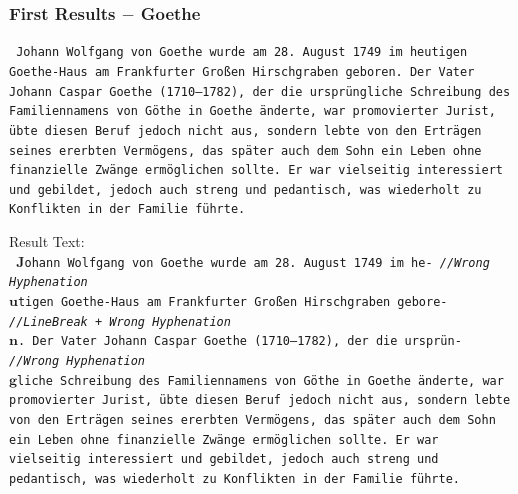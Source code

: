\documentclass{beamer}
\begin{document}
\begin{frame}
\frametitle{First Results $-$ Goethe}
\texttt{\tiny
Johann Wolfgang von Goethe wurde am 28. August 1749 im heutigen \\
Goethe-Haus am Frankfurter Großen Hirschgraben geboren. Der Vater \\
Johann Caspar Goethe (1710–1782), der die ursprüngliche Schreibung des \\
Familiennamens von Göthe in Goethe änderte, war promovierter Jurist, \\
übte diesen Beruf jedoch nicht aus, sondern lebte von den Erträgen \\
seines ererbten Vermögens, das später auch dem Sohn ein Leben ohne \\
finanzielle Zwänge ermöglichen sollte. Er war vielseitig interessiert \\
und gebildet, jedoch auch streng und pedantisch, was wiederholt zu \\
Konflikten in der Familie führte. \\
}

Result Text: \\

\texttt{\tiny
$\boldsymbol{J}$ohann Wolfgang von Goethe wurde am 28. August 1749 im he- \hskip 16pt \emph{//Wrong Hyphenation} \\
$\boldsymbol{u}$tigen Goethe-Haus am Frankfurter Großen Hirschgraben gebore- \hskip 10pt \emph{//LineBreak + Wrong Hyphenation} \\
$\boldsymbol{n}$. Der Vater Johann Caspar Goethe (1710–1782), der die ursprün- \emph{//Wrong Hyphenation} \\
$\boldsymbol{g}$liche Schreibung des Familiennamens von Göthe in Goethe änderte, war \\
promovierter Jurist, übte diesen Beruf jedoch nicht aus, sondern lebte \\
von den Erträgen seines ererbten Vermögens, das später auch dem Sohn \\
ein Leben ohne finanzielle Zwänge ermöglichen sollte. Er war \\
vielseitig interessiert und gebildet, jedoch auch streng und \\
pedantisch, was wiederholt zu Konflikten in der Familie führte. \\
}
\end{frame}
\end{document}
